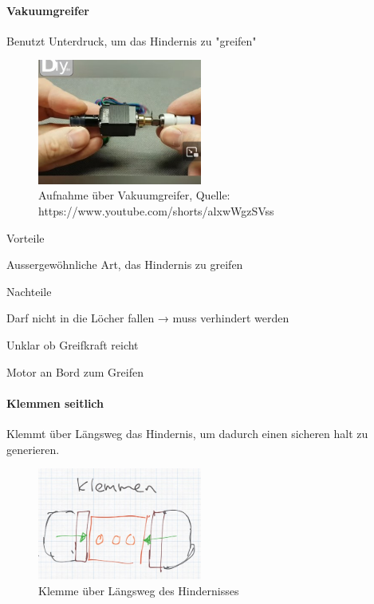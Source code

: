 \paragraph{Vakuumgreifer}
Benutzt Unterdruck, um das Hindernis zu "greifen"
\begin{figure}[h!]
        \centering
        \includegraphics[width=0.48\textwidth]{img/technologierecherche/Aufnahme/Vakuumgreifer.jpg}
        \caption{Aufnahme über Vakuumgreifer, Quelle: https://www.youtube.com/shorts/alxwWgzSVss} 
        \label{img:tech_Vakuumgreifer}
\end{figure}

\begin{minipage}[t]{0.48\textwidth}
    \begin{items}
          \item [Vorteile]
          \item Aussergewöhnliche Art, das Hindernis zu greifen
    \end{items}
\end{minipage}
\hfill
\begin{minipage}[t]{0.48\textwidth}
    \begin{items}
          \item [Nachteile]
          \item Darf nicht in die Löcher fallen → muss verhindert werden
          \item Unklar ob Greifkraft reicht
          \item Motor an Bord zum Greifen
    \end{items}
\end{minipage}
\paragraph{Klemmen seitlich}
Klemmt über Längsweg das Hindernis, um dadurch einen sicheren halt zu generieren.

\begin{figure}[h!]
        \centering
        \includegraphics[width=0.48\textwidth]{img/technologierecherche/Aufnahme/Laengsweg_Griff.jpg}
        \caption{Klemme über Längsweg des Hindernisses}
        \label{img:tech_Laengsweg_Griff}
\end{figure}

